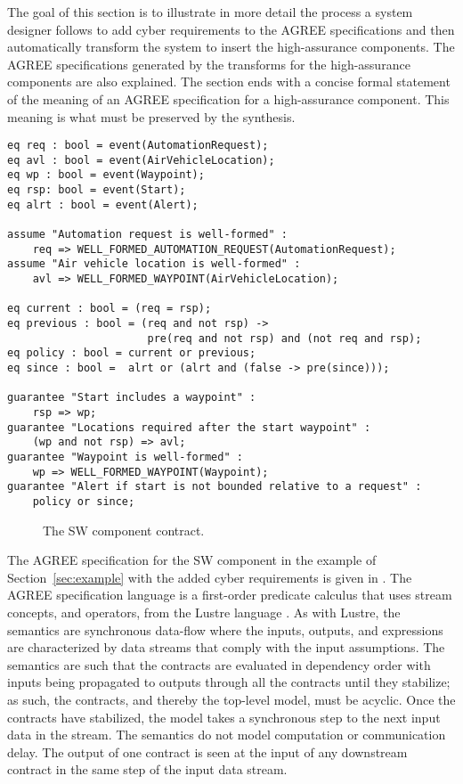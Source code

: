 The goal of this section is to illustrate in more detail the process a
system designer follows to add cyber requirements to the AGREE
specifications and then automatically transform the system to insert
the high-assurance components. The AGREE specifications generated by
the transforms for the high-assurance components are also
explained. The section ends with a concise formal statement of the
meaning of an AGREE specification for a high-assurance component. This
meaning is what must be preserved by the synthesis.

\newsavebox{\sw}
\begin{lrbox}{\sw}
\begin{lstlisting}[style=agree]
eq req : bool = event(AutomationRequest);
eq avl : bool = event(AirVehicleLocation);
eq wp : bool = event(Waypoint);
eq rsp: bool = event(Start);
eq alrt : bool = event(Alert);

assume "Automation request is well-formed" :
    req => WELL_FORMED_AUTOMATION_REQUEST(AutomationRequest);
assume "Air vehicle location is well-formed" :
    avl => WELL_FORMED_WAYPOINT(AirVehicleLocation);

eq current : bool = (req = rsp);
eq previous : bool = (req and not rsp) ->
                      pre(req and not rsp) and (not req and rsp);
eq policy : bool = current or previous;
eq since : bool =  alrt or (alrt and (false -> pre(since)));

guarantee "Start includes a waypoint" :
    rsp => wp;
guarantee "Locations required after the start waypoint" :
    (wp and not rsp) => avl;
guarantee "Waypoint is well-formed" :
    wp => WELL_FORMED_WAYPOINT(Waypoint);
guarantee "Alert if start is not bounded relative to a request" :
    policy or since;
\end{lstlisting}
\end{lrbox}

\begin{figure}
  \begin{center}
    \scalebox{0.60}{\usebox{\sw}}
  \end{center}
  \caption{The SW component contract.}
  \label{fig:sw}
\end{figure}

The AGREE specification for the SW component in the example of Section~\ref{sec:example} with the added cyber requirements is given in . The AGREE specification language is a first-order predicate calculus that uses stream concepts, and operators, from the Lustre language \cite{10.1145/41625.41641}. As with Lustre, the semantics are synchronous data-flow where the inputs, outputs, and expressions are characterized by data streams that comply with the input assumptions. The semantics are such that the contracts are evaluated in dependency order with inputs being propagated to outputs through all the contracts until they stabilize; as such, the contracts, and thereby the top-level model, must be acyclic. Once the contracts have stabilized, the model takes a synchronous step to the next input data in the stream. The semantics do not model computation or communication delay. The output of one contract is seen at the input of any downstream contract in the same step of the input data stream.

